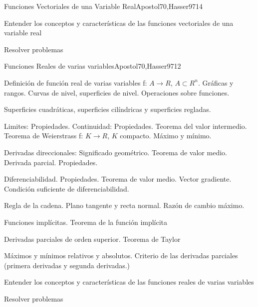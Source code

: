\begin{syllabus}
\begin{unit}{Funciones Vectoriales de una Variable Real}{Apostol70,Hasser97}{14}
   \begin{unitgoals}
         \item  Entender los conceptos y características de las funciones vectoriales de una variable real
         \item  Resolver problemas
   \end{unitgoals}
\end{unit}

\begin{unit}{Funciones Reales de varias variables}{Apostol70,Hasser97}{12}
   \begin{topics}
	\item  Definición de función real de varias variables f: $A \rightarrow R$, $A \subset R^n$. Gráficas y rangos. Curvas de nivel, superficies de nivel. Operaciones sobre funciones.
	\item  Superficies cuadráticas, superficies cilíndricas y superficies regladas.
	\item  Limites: Propiedades. Continuidad: Propiedades. Teorema del valor intermedio. Teorema de Weierstrass f: $K \rightarrow R$, $K$ compacto. Máximo y mínimo.
	\item  Derivadas direccionales: Significado geométrico. Teorema de valor medio. Derivada parcial. Propiedades.
	\item  Diferenciabilidad. Propiedades. Teorema de valor medio. Vector gradiente. Condición suficiente de diferenciabilidad.
	\item  Regla de la cadena. Plano tangente y recta normal. Razón de cambio máximo.
	\item Funciones implícitas. Teorema de la función implícita
	\item Derivadas parciales de orden superior. Teorema de Taylor
	\item Máximos y mínimos relativos y absolutos. Criterio de las derivadas parciales (primera derivadas y segunda derivadas.)
   \end{topics}

   \begin{unitgoals}
         \item  Entender los conceptos y características de las funciones reales de varias variables
         \item  Resolver problemas
   \end{unitgoals}
\end{unit}


\end{syllabus}
